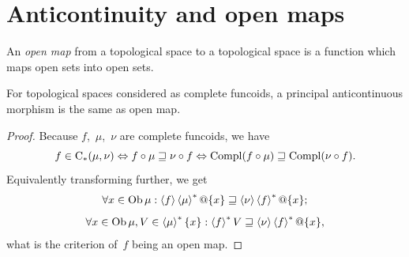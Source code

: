 \section{Anticontinuity and open maps}

\begin{defn}
An \emph{open map} from a topological space to a
topological space is a function which maps open sets into open sets.
\end{defn}

\begin{thm}
For topological spaces considered as complete funcoids,
a principal anticontinuous morphism is the same as open map.
\end{thm}

\begin{proof}
Because $f$,~$\mu$,~$\nu$ are complete funcoids, we have
\[
f\in\mathrm{C}_{\ast}(\mu,\nu)\Leftrightarrow
f\circ\mu\sqsupseteq\nu\circ f\Leftrightarrow
\operatorname{Compl}(f\circ\mu)\sqsupseteq\operatorname{Compl}(\nu\circ f).
\]
Equivalently transforming further, we get
\[
\forall x\in\operatorname{Ob}\mu:\left\langle f\right\rangle\left\langle \mu\right\rangle ^{\ast}@\{x\}\sqsupseteq\left\langle \nu\right\rangle\left\langle f\right\rangle ^{\ast}@\{x\};
\]
\[
\forall x\in\operatorname{Ob}\mu,V\in\left\langle \mu\right\rangle ^{\ast}\{x\}:\left\langle f\right\rangle ^{\ast}V\sqsupseteq\left\langle \nu\right\rangle\left\langle f\right\rangle ^{\ast}@\{x\},
\]
what is the criterion of~$f$ being an open map.
\end{proof}